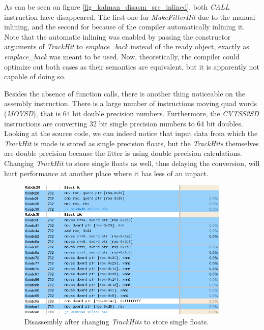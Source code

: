 \documentclass[12pt]{article}
\begin{document}
As can be seen on figure \ref{fig_kalman_disasm_src_inlined}, both \textit{CALL} instruction have disappeared. The first one for \textit{MakeFitterHit} due to the manual inlining, and the second for  because of the compiler automatically inlining it. Note that the automatic inlining was enabled by passing the constructor arguments of \textit{TrackHit} to \textit{emplace\_back} instead of the ready object, exactly as \textit{emplace\_back} was meant to be used. Now, theoretically, the compiler could optimize out both cases as their semantics are equivalent, but it is apparently not capable of doing so.

Besides the absence of function calls, there is another thing noticeable on the assembly instruction. There is a large number of instructions moving quad words (\textit{MOVSD}), that is 64 bit double precision numbers. Furthermore, the \textit{CVTSS2SD} instructions are converting 32 bit single precision numbers to 64 bit doubles. Looking at the source code, we can indeed notice that input data from which the \textit{TrackHit} is made is stored as single precision floats, but the \textit{TrackHits} themselves are double precision because the fitter is using double precision calculations. Changing \textit{TrackHit} to store single floats as well, thus delaying the conversion, will hurt performance at another place where it has less of an impact.


\begin{figure}[H]
	\begin{center}
		\includegraphics[width=0.9\textwidth]{kalmanfit_disasm_opt_asm_nocvt}
	\end{center}
	\caption{Disassembly after changing \textit{TrackHits} to store single floats.}
	\label{fig_kalman_disasm_src_nocvt}
\end{figure}
\end{document}
